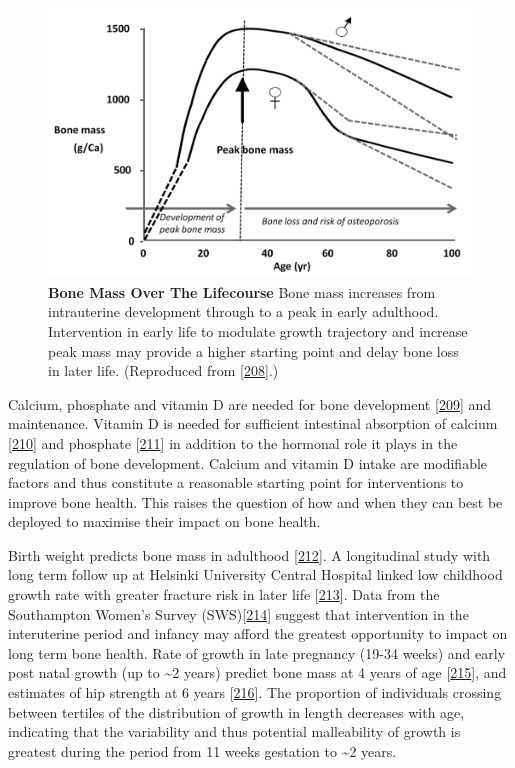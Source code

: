 \documentclass[
]{book}
\begin{document}
\begin{figure}

{\centering \includegraphics[width=0.8\linewidth]{figs/Harvey2014bfig1} 

}

\caption{\textbf{Bone Mass Over The Lifecourse} Bone mass increases from intrauterine development through to a peak in early adulthood. Intervention in early life to modulate growth trajectory and increase peak mass may provide a higher starting point and delay bone loss in later life. (Reproduced from {[}\protect\hyperlink{ref-Harvey2014b}{208}{]}.)}\label{fig:Harvey2014bfig1}
\end{figure}



Calcium, phosphate and vitamin D are needed for bone development {[}\protect\hyperlink{ref-Bikle2012}{209}{]} and maintenance.
Vitamin D is needed for sufficient intestinal absorption of calcium {[}\protect\hyperlink{ref-Christakos2011}{210}{]} and phosphate {[}\protect\hyperlink{ref-Fukumoto2014}{211}{]} in addition to the hormonal role it plays in the regulation of bone development.
Calcium and vitamin D intake are modifiable factors and thus constitute a reasonable starting point for interventions to improve bone health.
This raises the question of how and when they can best be deployed to maximise their impact on bone health.

Birth weight predicts bone mass in adulthood {[}\protect\hyperlink{ref-Baird2011}{212}{]}.
A longitudinal study with long term follow up at Helsinki University Central Hospital linked low childhood growth rate with greater fracture risk in later life {[}\protect\hyperlink{ref-Cooper2001}{213}{]}.
Data from the Southampton Women's Survey (SWS){[}\protect\hyperlink{ref-Inskip2006}{214}{]} suggest that intervention in the interuterine period and infancy may afford the greatest opportunity to impact on long term bone health.
Rate of growth in late pregnancy (19-34 weeks) and early post natal growth (up to \textasciitilde2 years) predict bone mass at 4 years of age {[}\protect\hyperlink{ref-Harvey2010a}{215}{]}, and estimates of hip strength at 6 years {[}\protect\hyperlink{ref-Harvey2013}{216}{]}.
The proportion of individuals crossing between tertiles of the distribution of growth in length decreases with age, indicating that the variability and thus potential malleability of growth is greatest during the period from 11 weeks gestation to \textasciitilde2 years.
\end{document}

